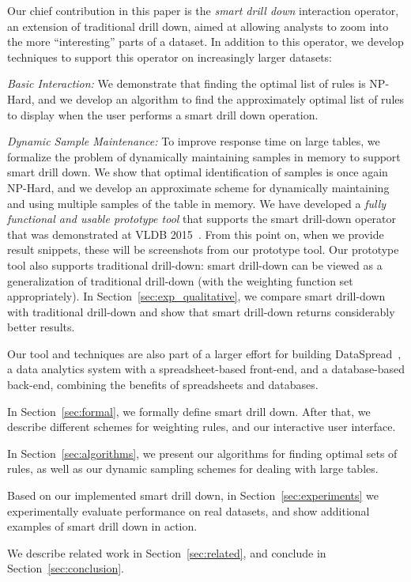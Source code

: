  Our chief contribution in this paper is the {\em smart drill down} interaction operator,
an extension of traditional drill down, aimed at allowing analysts to zoom into the
more ``interesting'' parts of a dataset. In addition to this operator,
we develop techniques to support this operator on increasingly larger datasets:
\squishlist
\item {\em Basic Interaction:} We demonstrate that finding the optimal list of rules is {\sc NP-Hard},
and we develop an algorithm to find the approximately optimal list of rules to display when the user performs a smart drill down operation. 
\item {\em Dynamic Sample Maintenance:} To improve response time on large tables, we formalize the problem of dynamically
maintaining samples in memory to support smart drill down. 
We show that optimal identification of samples is once again {\sc NP-Hard}, and 
we develop an approximate scheme for dynamically maintaining and using multiple samples of the table in memory.
\squishend
We have developed a {\em fully functional and usable prototype tool} that supports the smart drill-down operator that was demonstrated at VLDB 2015~\cite{DBLP:journals/pvldb/JoglekarGP15}. From this point on, when we provide result snippets, these will be screenshots from our prototype tool. Our prototype tool also supports traditional drill-down: smart drill-down 
can be viewed as a generalization of traditional drill-down (with the weighting function set appropriately). In Section~\ref{sec:exp_qualitative}, we compare smart drill-down with traditional drill-down and show that smart drill-down returns considerably better results.

Our tool and techniques are also part of a larger effort for
building {\sc DataSpread}~\cite{dataspread}, a data analytics system with a spreadsheet-based front-end, and a database-based back-end, combining the benefits of spreadsheets and databases.

\squishlist 

\item In Section~\ref{sec:formal}, we formally define smart drill down. After that, we describe different schemes for weighting rules, and our interactive user interface.

\item In Section~\ref{sec:algorithms}, we present our algorithms for
finding optimal sets of rules, as well as our dynamic sampling schemes
for dealing with large tables.

\item Based on our implemented smart drill down,
in Section~\ref{sec:experiments} we experimentally evaluate
performance on real datasets,
and show additional examples of smart drill down in action.

\item We describe related work in Section~\ref{sec:related}, and conclude in Section~\ref{sec:conclusion}.
\squishend 
